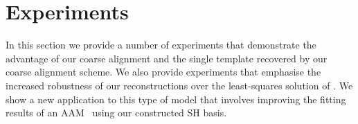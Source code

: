 \section{Experiments}\label{sec:imag_coll_experiments}
In this section we provide a number of experiments that demonstrate the
advantage of our coarse alignment and the single template recovered by our
coarse alignment scheme. We also provide experiments that emphasise the increased
robustness of our reconstructions over the least-squares solution of
\citet{KemelmacherShlizerman:2013iv}. We show a new application to this type
of model that involves improving the fitting results of an
AAM~\cite{cootes2001active} using our
constructed SH basis.
